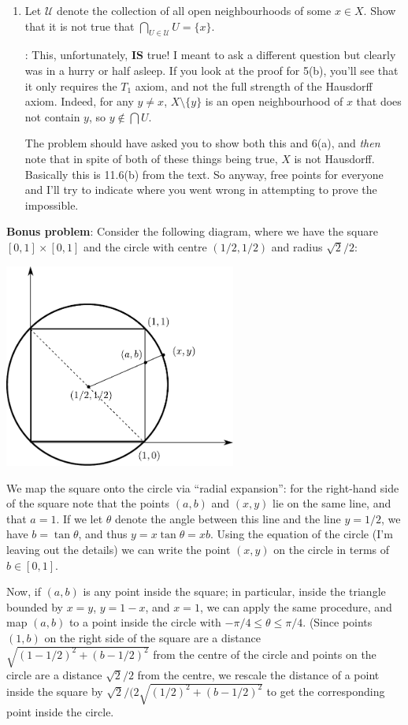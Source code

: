 \documentclass[letterpaper,12pt]{article}
\begin{document}
\begin{enumerate}
\begin{enumerate}
 \item Let $\mathcal{U}$ denote the collection of all open neighbourhoods of some $x\in X$. Show that it is not true that $\bigcap_{U\in \mathcal{U}}U = \{x\}$.

\bigskip

: This, unfortunately, {\bf IS} true! I meant to ask a different question but clearly was in a hurry or half asleep. If you look at the proof for 5(b), you'll see that it only requires the $T_1$ axiom, and not the full strength of the Hausdorff axiom. Indeed, for any $y\neq x$, $X\setminus \{y\}$ is an open neighbourhood of $x$ that does not contain $y$, so $y\notin \bigcap U$.

The problem should have asked you to show both this and 6(a), and {\em then} note that in spite of both of these things being true, $X$ is not Hausdorff. Basically this is 11.6(b) from the text. So anyway, free points for everyone and I'll try to indicate where you went wrong in attempting to prove the impossible.

\end{enumerate}
{\bf Bonus problem}: Consider the following diagram, where we have the square $[0,1]\times [0,1]$ and the circle with centre $(1/2,1/2)$ and radius $\sqrt{2}/2$:
\begin{center}
 \includegraphics[width=3in]{Bonus.pdf}
\end{center}
We map the square onto the circle via ``radial expansion'': for the right-hand side of the square note that the points $(a,b)$ and $(x,y)$ lie on the same line, and that $a=1$. If we let $\theta$ denote the angle between this line and the line $y=1/2$, we have $b=\tan\theta$, and thus $y=x\tan\theta = xb$. Using the equation of the circle (I'm leaving out the details) we can write the point $(x,y)$ on the circle in terms of $b\in [0,1]$.

Now, if $(a,b)$ is any point inside the square; in particular, inside the triangle bounded by $x=y$, $y=1-x$, and $x=1$, we can apply the same procedure, and map $(a,b)$ to a point inside the circle with $-\pi/4\leq \theta\leq \pi/4$. (Since points $(1,b)$ on the right side of the square are a distance $\sqrt{(1-1/2)^2+(b-1/2)^2}$ from the centre of the circle and points on the circle are a distance $\sqrt{2}/2$ from the centre, we rescale the distance of a point inside the square by $\sqrt{2}/(2\sqrt{(1/2)^2+(b-1/2)^2}$ to get the corresponding point inside the circle.


\end{enumerate}
\end{document}
